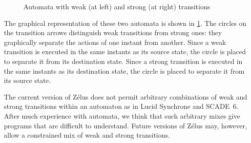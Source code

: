 \documentclass[11pt,titlepage,twoside]{report}
\makeatletter
\newcommand{\zls}[1]{{\@span{class="zelusinline"}#1}}
\newcommand{\zls}[1]{\texttt{#1}}
\renewcommand{\zls}[1]{\texttt{#1}}
\newcommand{\zelus}{{\sf Z\'elus}}
\newcommand{\lucy}{{\sf Lucid Synchrone}}
\newcommand{\scadesix}{{\sf SCADE~6}}
\newcommand{\Remark}{\medskip\noindent{\bf Remark: }}
\makeatother
\begin{document}
\begin{figure}[t]
\centering%
\caption{Automata with weak (at left) and strong (at right) 
transitions~\label{switch-figure}}
\end{figure}
The graphical representation of these two automata is shown in
\cref{switch-figure}.
The circles on the transition arrows distinguish weak transitions from 
strong ones: they graphically separate the actions of one instant from 
another.
Since a weak transition is executed in the same instants as its source 
state, the circle is placed to separate it from its destination state.
Since a strong transition is executed in the same instants as its 
destination state, the circle is placed to separate it from its source 
state.

%

\Remark The current version of \zelus{} does not permit arbitrary 
combinations of weak and strong transitions within an automaton as in 
\lucy{} and \scadesix{}.
After much experience with automata, we think that such arbitrary mixes give 
programs that are difficult to understand.
Future versions of \zelus{} may, however, allow a constrained mix of weak 
and strong transitions.
\end{document}
